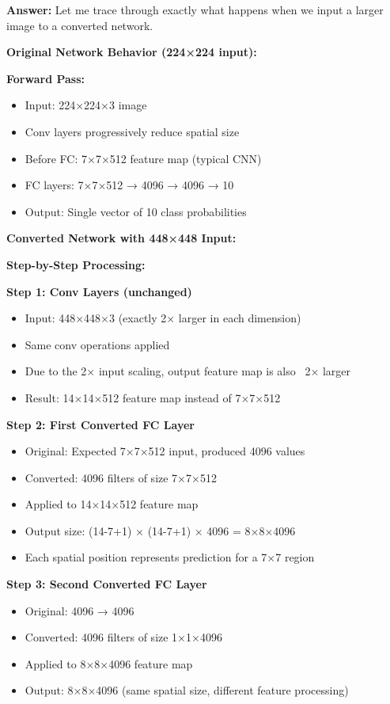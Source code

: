 \documentclass[12pt]{article}
\newcommand{\answer}[1]{{\color{answercolor}\textbf{Answer:} #1}}
\newcommand{\explanation}[1]{{\color{explanationcolor}#1}}
\begin{document}
\begin{enumerate}[(a)]
    \answer{
    Let me trace through exactly what happens when we input a larger image to a converted network.
    
    \textbf{Original Network Behavior (224×224 input):}
    
    \explanation{
    \textbf{Forward Pass:}
    \begin{itemize}
        \item Input: 224×224×3 image
        \item Conv layers progressively reduce spatial size
        \item Before FC: 7×7×512 feature map (typical CNN)
        \item FC layers: 7×7×512 → 4096 → 4096 → 10
        \item Output: Single vector of 10 class probabilities
    \end{itemize}
    }
    
    \textbf{Converted Network with 448×448 Input:}
    
    \explanation{
    \textbf{Step-by-Step Processing:}
    
    \textbf{Step 1: Conv Layers (unchanged)}
    \begin{itemize}
        \item Input: 448×448×3 (exactly 2× larger in each dimension)
        \item Same conv operations applied
        \item Due to the 2× input scaling, output feature map is also ~2× larger
        \item Result: 14×14×512 feature map instead of 7×7×512
    \end{itemize}
    
    \textbf{Step 2: First Converted FC Layer}
    \begin{itemize}
        \item Original: Expected 7×7×512 input, produced 4096 values
        \item Converted: 4096 filters of size 7×7×512
        \item Applied to 14×14×512 feature map
        \item Output size: (14-7+1) × (14-7+1) × 4096 = 8×8×4096
        \item Each spatial position represents prediction for a 7×7 region
    \end{itemize}
    
    \textbf{Step 3: Second Converted FC Layer}
    \begin{itemize}
        \item Original: 4096 → 4096
        \item Converted: 4096 filters of size 1×1×4096
        \item Applied to 8×8×4096 feature map
        \item Output: 8×8×4096 (same spatial size, different feature processing)
    \end{itemize}
    
}}
\end{enumerate}
\end{document}
